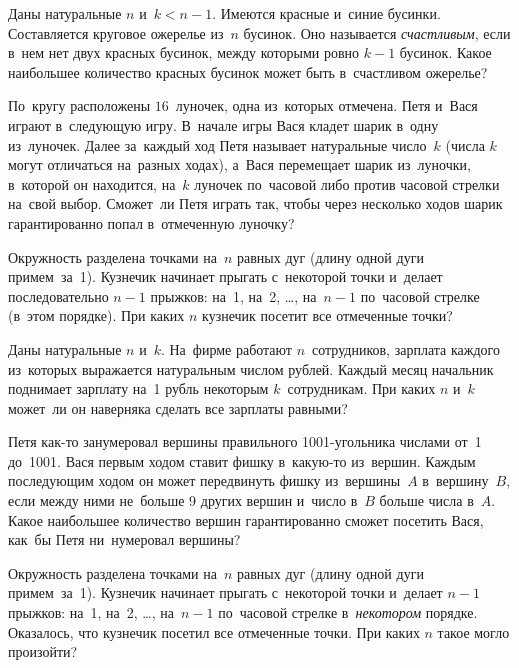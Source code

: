 


\begin{problems}

\item
Даны натуральные $n$ и~$k < n - 1$.
Имеются красные и~синие бусинки.
Составляется круговое ожерелье из~$n$ бусинок.
Оно называется \emph{счастливым}, если в~нем нет двух красных бусинок, между
которыми ровно $k - 1$ бусинок.
Какое наибольшее количество красных бусинок может быть в~счастливом ожерелье?

\item
По~кругу расположены $16$~луночек, одна из~которых отмечена.
Петя и~Вася играют в~следующую игру.
В~начале игры Вася кладет шарик в~одну из~луночек.
Далее за~каждый ход Петя называет натуральные число~$k$
(числа $k$ могут отличаться на~разных ходах), а~Вася перемещает шарик
из~луночки, в~которой он находится, на~$k$ луночек по~часовой либо против
часовой стрелки на~свой выбор.
Сможет~ли Петя играть так, чтобы через несколько ходов шарик гарантированно
попал в~отмеченную луночку?

\item
Окружность разделена точками на~$n$ равных дуг (длину одной дуги примем~за~1).
Кузнечик начинает прыгать с~некоторой точки и~делает последовательно
$n - 1$ прыжков: на~1, на~2, \ldots, на~$n - 1$ по~часовой стрелке
(в~этом порядке).
При каких $n$ кузнечик посетит все отмеченные точки?

\item
Даны натуральные $n$ и~$k$.
На~фирме работают $n$~сотрудников, зарплата каждого из~которых выражается
натуральным числом рублей.
Каждый месяц начальник поднимает зарплату на~1 рубль некоторым $k$~сотрудникам.
При каких $n$ и~$k$ может~ли он наверняка сделать все зарплаты равными?

\item
Петя как-то занумеровал вершины правильного 1001-угольника числами
от~1 до~1001.
Вася первым ходом ставит фишку в~какую-то из~вершин.
Каждым последующим ходом он может передвинуть фишку из~вершины~$A$
в~вершину~$B$, если между ними не~больше 9 других вершин и~число в~$B$ больше
числа в~$A$.
Какое наибольшее количество вершин гарантированно сможет посетить Вася, как~бы
Петя ни~нумеровал вершины?

\item
Окружность разделена точками на~$n$ равных дуг (длину одной дуги примем~за~1).
Кузнечик начинает прыгать с~некоторой точки и~делает $n - 1$ прыжков:
на~1, на~2, \ldots, на~$n-1$ по~часовой стрелке в~\emph{некотором} порядке.
Оказалось, что кузнечик посетил все отмеченные точки.
При каких $n$ такое могло произойти?


\end{problems}
